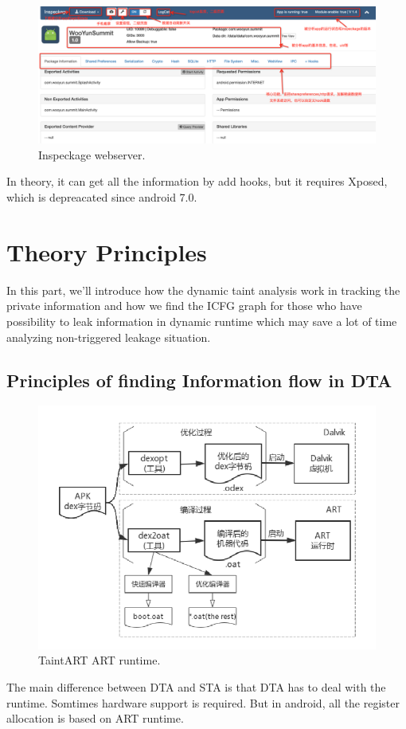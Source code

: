 \documentclass{article}
\begin{document}
\begin{figure}[ht]
  \centering
  \includegraphics[scale=0.1]{inspeckage2.png}
  \caption{Inspeckage webserver.}
  \label{fig:inspeckage1}
\end{figure}

In theory, it can get all the information by add hooks, but it requires Xposed, which is depreacated since android 7.0.

\section{Theory Principles}
In this part, we'll introduce how the dynamic taint analysis work in tracking the private information and how we find the ICFG graph for those who have possibility to leak information in dynamic runtime which may save a lot of time analyzing non-triggered leakage situation.
\subsection{Principles of finding Information flow in DTA}
\begin{figure}[ht]
  \centering
  \includegraphics[scale=0.3]{TaintART1.png}
  \caption{TaintART ART runtime.}
  \label{fig:TaintART1}
\end{figure}
The main difference between DTA and STA is that DTA has to deal with the runtime. Somtimes hardware support is required. But in android, all the register allocation is based on ART runtime. 
\end{document}

